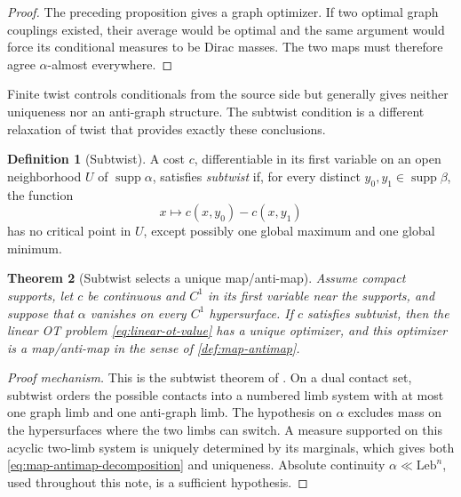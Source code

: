 \documentclass[11pt,a4paper]{article}
\newtheorem{theorem}{Theorem}[section]
\theoremstyle{definition}
\newtheorem{definition}[theorem]{Definition}
\theoremstyle{remark}
\newcommand{\supp}{\operatorname{supp}}
\begin{document}
\begin{proof}
The preceding proposition gives a graph optimizer.  If two optimal graph
couplings existed, their average would be optimal and the same argument would
force its conditional measures to be Dirac masses.  The two maps must
therefore agree \(\alpha\)-almost everywhere.
\end{proof}

Finite twist controls conditionals from the source side but generally gives
neither uniqueness nor an anti-graph structure.  The subtwist condition is a
different relaxation of twist that provides exactly these conclusions.

\begin{definition}[Subtwist]
\label{def:subtwist}
A cost \(c\), differentiable in its first variable on an open neighborhood
\(U\) of \(\supp\alpha\), satisfies \emph{subtwist} if, for every distinct
\(y_0,y_1\in\supp\beta\), the function
\begin{equation*}
  x\longmapsto c(x,y_0)-c(x,y_1)
\end{equation*}
has no critical point in \(U\), except possibly one global maximum and one
global minimum.
\end{definition}

\begin{theorem}[Subtwist selects a unique map/anti-map]
\label{thm:subtwist-linear-ot}
Assume compact supports, let \(c\) be continuous and \(C^1\) in its first
variable near the supports, and suppose that \(\alpha\) vanishes on every
\(C^1\) hypersurface.  If \(c\) satisfies subtwist, then the linear OT problem
\eqref{eq:linear-ot-value} has a unique optimizer, and this optimizer is a
map/anti-map in the sense of \cref{def:map-antimap}.
\end{theorem}

\begin{proof}[Proof mechanism]
This is the subtwist theorem of
\citet{ChiapporiMcCannNesheim2010,AhmadKimMcCann2011}.  On a dual contact set,
subtwist orders the possible contacts into a numbered limb system with at most
one graph limb and one anti-graph limb.  The hypothesis on \(\alpha\) excludes
mass on the hypersurfaces where the two limbs can switch.  A measure supported
on this acyclic two-limb system is uniquely determined by its marginals, which
gives both \eqref{eq:map-antimap-decomposition} and uniqueness.  Absolute
continuity \(\alpha\ll\mathrm{Leb}^n\), used throughout this note, is a
sufficient hypothesis.
\end{proof}
\end{document}
